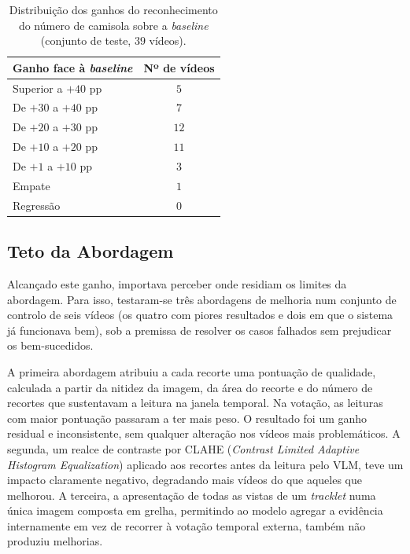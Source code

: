 \begin{table}[htbp]
    \centering
    \caption{Distribuição dos ganhos do reconhecimento do número de camisola sobre a \emph{baseline}
    (conjunto de teste, $39$ vídeos).}
    \label{tab:jnr-distribuicao}
    \begin{tabular}{lc}
        \hline
        \textbf{Ganho face à \emph{baseline}} & \textbf{Nº de vídeos} \\
        \hline
        Superior a $+40$ pp & $5$ \\
        De $+30$ a $+40$ pp & $7$ \\
        De $+20$ a $+30$ pp & $12$ \\
        De $+10$ a $+20$ pp & $11$ \\
        De $+1$ a $+10$ pp  & $3$ \\
        Empate              & $1$ \\
        Regressão           & $0$ \\
        \hline
    \end{tabular}
\end{table}

\subsection{Teto da Abordagem}
\label{sec:res_jnr_teto}

Alcançado este ganho, importava perceber onde residiam os limites da abordagem. Para isso,
testaram-se três abordagens de melhoria num conjunto de controlo de seis vídeos (os quatro
com piores resultados e dois em que o sistema já funcionava bem), sob a premissa de
resolver os casos falhados sem prejudicar os bem-sucedidos.

A primeira abordagem atribuiu a cada recorte uma pontuação de qualidade, calculada a partir
da nitidez da imagem, da área do recorte e do número de recortes que sustentavam a leitura
na janela temporal. Na votação, as leituras com maior pontuação passaram a ter mais peso. O
resultado foi um ganho residual e inconsistente, sem qualquer alteração nos vídeos mais
problemáticos. A segunda, um realce de contraste por CLAHE (\emph{Contrast Limited Adaptive
Histogram Equalization}) aplicado aos recortes antes da leitura pelo VLM, teve um impacto
claramente negativo, degradando mais vídeos do que aqueles que melhorou. A terceira, a
apresentação de todas as vistas de um \emph{tracklet} numa única imagem composta em grelha,
permitindo ao modelo agregar a evidência internamente em vez de recorrer à votação temporal
externa, também não produziu melhorias.

